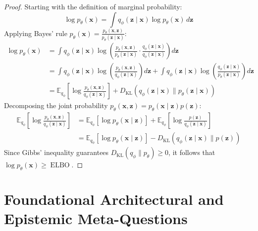 \documentclass[11pt,a4paper]{article}
\theoremstyle{definition}
\begin{document}
\begin{proof}
Starting with the definition of marginal probability:
{\boldmath
\begin{equation}
\log p_\theta(\mathbf{x}) = \int q_\phi(\mathbf{z} \mid \mathbf{x}) \log p_\theta(\mathbf{x}) \, d\mathbf{z}
\end{equation}
}
Applying Bayes' rule $p_\theta(\mathbf{x}) = \frac{p_\theta(\mathbf{x}, \mathbf{z})}{p_\theta(\mathbf{z} \mid \mathbf{x})}$:
{\boldmath
\begin{align}
\log p_\theta(\mathbf{x}) &= \int q_\phi(\mathbf{z} \mid \mathbf{x}) \log \left( \frac{p_\theta(\mathbf{x}, \mathbf{z})}{p_\theta(\mathbf{z} \mid \mathbf{x})} \cdot \frac{q_\phi(\mathbf{z} \mid \mathbf{x})}{q_\phi(\mathbf{z} \mid \mathbf{x})} \right) d\mathbf{z} \\
&= \int q_\phi(\mathbf{z} \mid \mathbf{x}) \log \left( \frac{p_\theta(\mathbf{x}, \mathbf{z})}{q_\phi(\mathbf{z} \mid \mathbf{x})} \right) d\mathbf{z} + \int q_\phi(\mathbf{z} \mid \mathbf{x}) \log \left( \frac{q_\phi(\mathbf{z} \mid \mathbf{x})}{p_\theta(\mathbf{z} \mid \mathbf{x})} \right) d\mathbf{z} \\
&= \mathbb{E}_{q_\phi}\left[ \log \frac{p_\theta(\mathbf{x}, \mathbf{z})}{q_\phi(\mathbf{z} \mid \mathbf{x})} \right] + D_{\text{KL}}\left( q_\phi(\mathbf{z} \mid \mathbf{x}) \parallel p_\theta(\mathbf{z} \mid \mathbf{x}) \right)
\end{align}
}
Decomposing the joint probability $p_\theta(\mathbf{x}, \mathbf{z}) = p_\theta(\mathbf{x} \mid \mathbf{z}) p(\mathbf{z})$:
{\boldmath
\begin{align}
\mathbb{E}_{q_\phi}\left[ \log \frac{p_\theta(\mathbf{x}, \mathbf{z})}{q_\phi(\mathbf{z} \mid \mathbf{x})} \right] &= \mathbb{E}_{q_\phi}[\log p_\theta(\mathbf{x} \mid \mathbf{z})] + \mathbb{E}_{q_\phi}\left[ \log \frac{p(\mathbf{z})}{q_\phi(\mathbf{z} \mid \mathbf{x})} \right] \\
&= \mathbb{E}_{q_\phi}[\log p_\theta(\mathbf{x} \mid \mathbf{z})] - D_{\text{KL}}(q_\phi(\mathbf{z} \mid \mathbf{x}) \parallel p(\mathbf{z}))
\end{align}
}
Since Gibbs' inequality guarantees $D_{\text{KL}}(q_\phi \parallel p_\theta) \ge 0$, it follows that $\log p_\theta(\mathbf{x}) \ge \operatorname{ELBO}$.
\end{proof}

\section{Foundational Architectural and Epistemic Meta-Questions}
\end{document}
